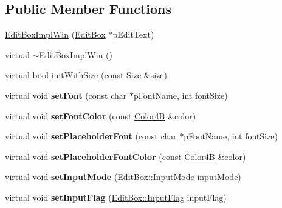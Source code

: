 \subsection*{Public Member Functions}
\begin{DoxyCompactItemize}
\item 
\hyperlink{classui_1_1EditBoxImplWin_aed994ecac4c5fc87fd736bc12b6f0e8d}{Edit\+Box\+Impl\+Win} (\hyperlink{classui_1_1EditBox}{Edit\+Box} $\ast$p\+Edit\+Text)
\item 
virtual \hyperlink{classui_1_1EditBoxImplWin_abde4dd2c0eba107acb9a4c9abd598997}{$\sim$\+Edit\+Box\+Impl\+Win} ()
\item 
virtual bool \hyperlink{classui_1_1EditBoxImplWin_a347c134210f455ba359bea055277505e}{init\+With\+Size} (const \hyperlink{classSize}{Size} \&size)
\item 
\mbox{\label{classui_1_1EditBoxImplWin_a8ec070d6ed21def27f1ed4a3dfd36741}} 
virtual void {\bfseries set\+Font} (const char $\ast$p\+Font\+Name, int font\+Size)
\item 
\mbox{\label{classui_1_1EditBoxImplWin_a3a1391563f9d2595ee98c9868bd7d849}} 
virtual void {\bfseries set\+Font\+Color} (const \hyperlink{structColor4B}{Color4B} \&color)
\item 
\mbox{\label{classui_1_1EditBoxImplWin_a52937250ea3531341fbca75054e7edc2}} 
virtual void {\bfseries set\+Placeholder\+Font} (const char $\ast$p\+Font\+Name, int font\+Size)
\item 
\mbox{\label{classui_1_1EditBoxImplWin_af1473687ac01b615650366411e6bc1bd}} 
virtual void {\bfseries set\+Placeholder\+Font\+Color} (const \hyperlink{structColor4B}{Color4B} \&color)
\item 
\mbox{\label{classui_1_1EditBoxImplWin_aa4d8a96fcebc8adbd2a0ec9446840ddc}} 
virtual void {\bfseries set\+Input\+Mode} (\hyperlink{classui_1_1EditBox_a7a1bfe8f3ba218bedfcf5451ec3ce01a}{Edit\+Box\+::\+Input\+Mode} input\+Mode)
\item 
\mbox{\label{classui_1_1EditBoxImplWin_a90ecade553def1af0e1592ae6255fd6c}} 
virtual void {\bfseries set\+Input\+Flag} (\hyperlink{classui_1_1EditBox_af02f13ee9fba51d59bb3111e200848c8}{Edit\+Box\+::\+Input\+Flag} input\+Flag)

\end{DoxyCompactItemize}
